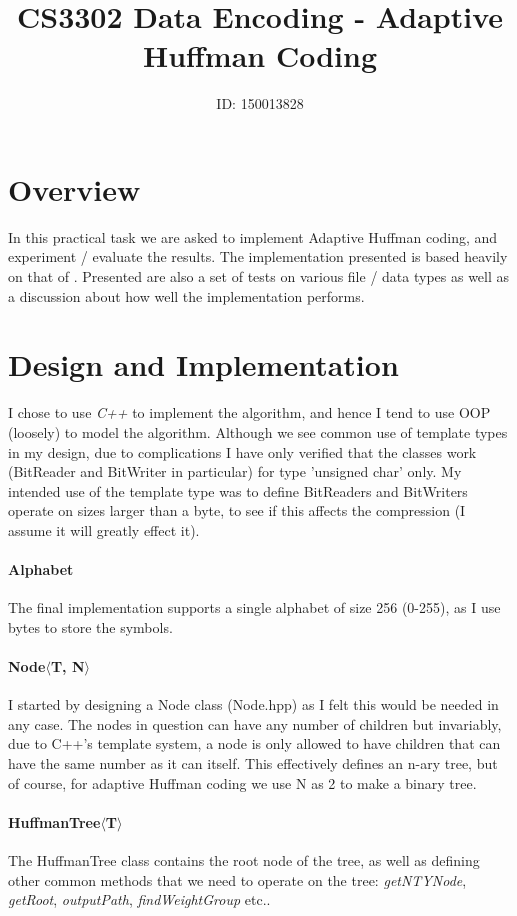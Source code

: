 \documentclass[]{article}
\title{CS3302 Data Encoding - Adaptive Huffman Coding}
\author{ID: 150013828}
\begin{document}
\maketitle

\section{Overview}
In this practical task we are asked to implement Adaptive Huffman coding, and experiment / evaluate the results. The implementation presented is based heavily on that of \citet{Sayood06}. Presented are also a set of tests on various file / data types as well as a discussion about how well the implementation performs.

\section{Design and Implementation}
I chose to use \emph{C++} to implement the algorithm, and hence I tend to use OOP (loosely) to model the algorithm. Although we see common use of template types in my design, due to complications I have only verified that the classes work (BitReader and BitWriter in particular) for type 'unsigned char' only. My intended use of the template type was to define BitReaders and BitWriters operate on sizes larger than a byte, to see if this affects the compression (I assume it will greatly effect it).
\paragraph{Alphabet} The final implementation supports a single alphabet of size 256 (0-255), as I use bytes to store the symbols.
\paragraph{Node$\langle$T, N$\rangle$} I started by designing a Node class (Node.hpp) as I felt this would be needed in any case. The nodes in question can have any number of children but invariably, due to C++'s template system, a node is only allowed to have children that can have the same number as it can itself. This effectively defines an n-ary tree, but of course, for adaptive Huffman coding we use N as 2 to make a binary tree.
\paragraph{HuffmanTree$\langle$T$\rangle$} The HuffmanTree class contains the root node of the tree, as well as defining other common methods that we need to operate on the tree: \emph{getNTYNode}, \emph{getRoot}, \emph{outputPath}, \emph{findWeightGroup} etc..
\end{document}

